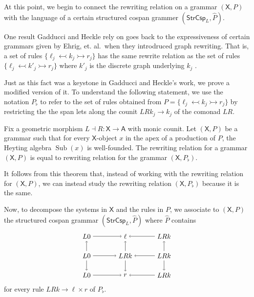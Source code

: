 \documentclass{amsart}
\newcommand{\A}{\cat{A}}
\newcommand{\X}{\cat{X}}
\newcommand{\StrCsp}{\cat{StrCsp}}
\newcommand{\cat}[1]{\mathsf{#1}}
\newcommand{\from}{\colon}
\newcommand{\monicto}{\rightarrowtail}
\newcommand{\monicgets}{\leftarrowtail}
\DeclareMathOperator{\Sub}{Sub}
\theoremstyle{remark}
\theoremstyle{definition}
\begin{document}
At this point, we begin to connect the rewriting relation on a grammar
$ ( \X , P ) $ with the language of a certain structured cospan
grammer $ ( \StrCsp_L , \hat{P} ) $.

One result Gadducci and Heckle rely on goes back to the expressiveness
of certain grammars given by Ehrig, et. al.~when they introdruced graph
rewriting.  That is, a set of rules
$ \{ \ell_j \monicgets k_j \monicto r_j \} $ has the same rewrite
relation as the set of rules
$ \{ \ell_j \monicgets k'_j \monicto r_j \} $ where $ k'_j $ is the
discrete graph underlying $ k_j $ \cite[Prop.~3.3]{Ehrig_GraphGram}.

Just as this fact was a keystone in Gadducci and Heckle's work, we
prove a modified version of it. To understand the following statement,
we use the notation $ P_\flat $ to refer to the set of rules obtained
from $ P = \{ \ell_j \monicgets k_j \monicto r_j \} $ by restricting
the the span lets along the counit $ LRk_j \to k_j $ of the comonad
$ LR $.

\begin{theorem*}[\ref{thm:production-same-rewrite-relation-as-discrete}]
Fix a geometric morphism $ L \dashv R \from \X \to \A $ with monic
counit. Let $ ( \X , P ) $ be a grammar such that for every
$ \X $-object $ x $ in the apex of a production of $ P $, the Heyting
algebra $ \Sub (x) $ is well-founded.  The rewriting relation for a
grammar $ ( \X , P ) $ is equal to rewriting relation for the grammar
$ ( \X , P_{\flat} ) $.
\end{theorem*}

It follows from this theorem that, instead of working with the
rewriting relation for $ ( \X , P ) $, we can instead study the
rewriting relation $ ( \X , P_\flat ) $ because it is the same.

Now, to decompose the systems in $ \X $ and the rules in $ P $, we
associate to $ ( \X , P ) $ the structured cospan grammar
$ ( \StrCsp_L , \hat{P} ) $ where $ \hat{P} $ contains
%
\[
  \begin{tikzpicture}
    \node (1) at (0,2) {$ L 0 $};
    \node (2) at (2,2) {$ \ell $};
    \node (3) at (4,2) {$ LRk $};
    \node (4) at (0,1) {$ L 0 $};
    \node (5) at (2,1) {$ LRk $};
    \node (6) at (4,1) {$ LRk $};
    \node (7) at (0,0) {$ L 0 $};
    \node (8) at (2,0) {$ r $};
    \node (9) at (4,0) {$ LRk $};
    \draw [->] (1) to node [] {\scriptsize{$  $}} (2);
    \draw [->] (3) to node [] {\scriptsize{$  $}} (2);
    \draw [->] (4) to node [] {\scriptsize{$  $}} (5);
    \draw [->] (6) to node [] {\scriptsize{$  $}} (5);
    \draw [->] (7) to node [] {\scriptsize{$  $}} (8);
    \draw [->] (9) to node [] {\scriptsize{$  $}} (8);
    \draw [->] (4) to node [] {\scriptsize{$  $}} (1);
    \draw [->] (4) to node [] {\scriptsize{$  $}} (7);
    \draw [->] (5) to node [] {\scriptsize{$  $}} (2);
    \draw [->] (5) to node [] {\scriptsize{$  $}} (8);
    \draw [->] (6) to node [] {\scriptsize{$  $}} (3);
    \draw [->] (6) to node [] {\scriptsize{$  $}} (9);
  \end{tikzpicture}
\]
% 
for every rule $ LRk \to \ell \times r $ of $ P_{\flat} $.
\end{document}
